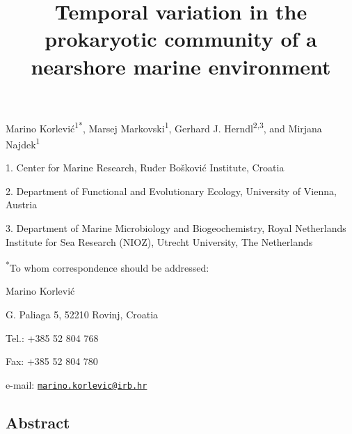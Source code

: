 \documentclass[
  12pt,
]{article}
\title{\textbf{Temporal variation in the prokaryotic community of a
nearshore marine environment}}
\author{}
\date{\vspace{-2.5em}}
\begin{document}
\maketitle

\vspace{20mm}

Marino Korlević\textsuperscript{1*}, Marsej
Markovski\textsuperscript{1}, Gerhard J. Herndl\textsuperscript{2,3},
and Mirjana Najdek\textsuperscript{1}

1. Center for Marine Research, Ruđer Bošković Institute, Croatia

2. Department of Functional and Evolutionary Ecology, University of
Vienna, Austria

3. Department of Marine Microbiology and Biogeochemistry, Royal
Netherlands Institute for Sea Research (NIOZ), Utrecht University, The
Netherlands

\textsuperscript{*}To whom correspondence should be addressed:

Marino Korlević

G. Paliaga 5, 52210 Rovinj, Croatia

Tel.: +385 52 804 768

Fax: +385 52 804 780

e-mail:
\href{mailto:marino.korlevic@irb.hr}{\nolinkurl{marino.korlevic@irb.hr}}

\newpage
\linenumbers
{}
\setlength\parindent{24pt}

\hypertarget{abstract}{%
\subsection{Abstract}\label{abstract}}
\end{document}
